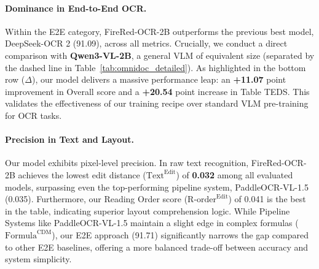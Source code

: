\paragraph{Dominance in End-to-End OCR.}
Within the E2E category, FireRed-OCR-2B outperforms the previous best model, DeepSeek-OCR 2 (91.09), across all metrics. Crucially, we conduct a direct comparison with \textbf{Qwen3-VL-2B}, a general VLM of equivalent size (separated by the dashed line in Table~\ref{tab:omnidoc_detailed}). As highlighted in the bottom row ($\Delta$), our model delivers a massive performance leap: an \textbf{+11.07} point improvement in Overall score and a \textbf{+20.54} point increase in Table TEDS. This validates the effectiveness of our training recipe over standard VLM pre-training for OCR tasks.

\paragraph{Precision in Text and Layout.}
Our model exhibits pixel-level precision. In raw text recognition, FireRed-OCR-2B achieves the lowest edit distance ($\text{Text}^{\text{Edit}}$) of \textbf{0.032} among all evaluated models, surpassing even the top-performing pipeline system, PaddleOCR-VL-1.5 (0.035). Furthermore, our Reading Order score ($\text{R-order}^{\text{Edit}}$) of 0.041 is the best in the table, indicating superior layout comprehension logic. While Pipeline Systems like PaddleOCR-VL-1.5 maintain a slight edge in complex formulas ($\text{Formula}^{\text{CDM}}$), our E2E approach (91.71) significantly narrows the gap compared to other E2E baselines, offering a more balanced trade-off between accuracy and system simplicity.

